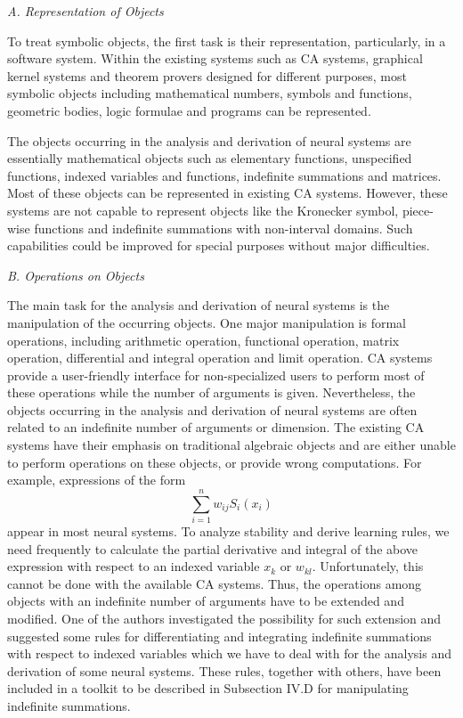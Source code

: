 \bigskip
\noindent
{\em A. Representation of Objects}

\smallskip
To treat symbolic objects, the first task is their representation, 
particularly, in a software system. Within the existing systems
such as CA systems, graphical kernel systems and theorem
provers designed for different purposes, most symbolic objects
including mathematical numbers, symbols and functions, geometric bodies,
logic formulae and programs can be represented.

The objects occurring in the analysis and derivation of neural systems
are essentially mathematical objects such as elementary functions, 
unspecified functions, indexed variables and functions, indefinite 
summations and matrices. Most of these objects can be represented in
existing CA systems. However, these systems are
not capable to represent objects like the Kronecker
symbol, piece-wise functions and indefinite summations with non-interval
domains. Such capabilities could be improved for special purposes
without
major difficulties.

\bigskip
\noindent
{\em B. Operations on Objects}

\smallskip
The main task for the analysis and derivation of neural systems is the
manipulation of the occurring objects. One major manipulation is 
formal operations, including arithmetic operation,
functional operation, matrix operation,
differential and integral operation and limit operation. CA 
systems provide a user-friendly interface for non-specialized users to
perform
most of these operations while the number of arguments is given.
Nevertheless, the objects occurring in the analysis and derivation of
neural systems are often related to an indefinite number of arguments 
or dimension. The existing CA systems 
have their emphasis on traditional algebraic objects and are either 
unable to perform operations on these objects, or provide wrong 
computations. For example, expressions of the form
\[\sum_{i=1}^nw_{ij}S_i(x_i)\]
appear in most neural systems. To analyze stability and derive learning
rules, we need frequently to calculate the partial derivative and
integral 
of the above expression with respect to an indexed variable $x_k$ or
$w_{kl}$. Unfortunately, this cannot be done with the available CA 
systems.
Thus, the operations among objects with an indefinite number of
arguments 
have to be extended and modified. One of the authors investigated the 
possibility 
for such extension and suggested some rules for differentiating and
integrating indefinite summations with respect to indexed variables
which 
we have to deal with for the analysis and 
derivation of some neural systems. These rules, together with others, 
have been included in a toolkit to be described in Subsection IV.D
for manipulating indefinite summations.  

